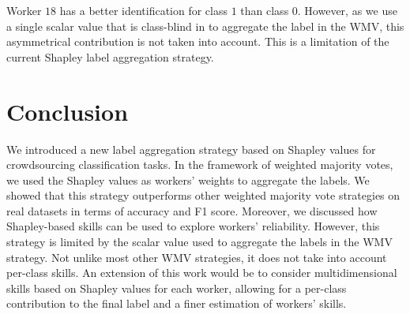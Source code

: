 \documentclass{cap2024}
\begin{document}
Worker $18$ has a better identification for class $1$ than class $0$.
However, as we use a single scalar value that is class-blind in  to aggregate the label in the WMV, this asymmetrical contribution is not taken into account.
This is a limitation of the current Shapley label aggregation strategy.

\section{Conclusion}
\label{sec:conclusion}

We introduced a new label aggregation strategy based on Shapley values for crowdsourcing classification tasks.
In the framework of weighted majority votes, we used the Shapley values as workers' weights to aggregate the labels.
We showed that this strategy outperforms other weighted majority vote strategies on real datasets in terms of accuracy and F1 score.
Moreover, we discussed how Shapley-based skills can be used to explore workers' reliability.
However, this strategy is limited by the scalar value used to aggregate the labels in the WMV strategy.
Not unlike most other WMV strategies, it does not take into account per-class skills.
An extension of this work would be to consider multidimensional skills based on Shapley values for each worker, allowing for a per-class contribution to the final label and a finer estimation of workers' skills.



\end{document}
